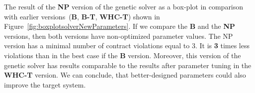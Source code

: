 \begin{table}
	\centering
	\caption{Parameters of NP and NP-T versions of the genetic solver}\label{tab:Parameters_NP-T}
\end{table}

The result of the \textbf{NP} version of the genetic solver as a box-plot in comparison with earlier versions~(\textbf{B}, \textbf{B-T}, \textbf{WHC-T}) shown in Figure~\ref{fig:boxplotsolverNewParameters}. If we compare the \textbf{B} and the \textbf{NP} versions, then both versions have non-optimized parameter values. The NP version has a minimal number of contract violations equal to 3. It is \textbf{3} times less violations than in the best case if the \textbf{B} version. Moreover, this version of the genetic solver has results comparable to the results after parameter tuning in the \textbf{WHC-T} version. We can conclude, that better-designed parameters could also improve the target system.

